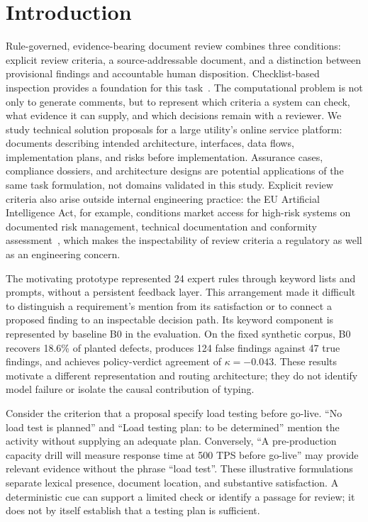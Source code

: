 \documentclass[computers,article,submit,moreauthors]{Definitions/mdpi}
\begin{document}
\section{Introduction}

Rule-governed, evidence-bearing document review combines three conditions: explicit review criteria, a source-addressable document, and a distinction between provisional findings and accountable human disposition. Checklist-based inspection provides a foundation for this task~\cite{fagan1976,lait2000}. The computational problem is not only to generate comments, but to represent which criteria a system can check, what evidence it can supply, and which decisions remain with a reviewer. We study technical solution proposals for a large utility's online service platform: documents describing intended architecture, interfaces, data flows, implementation plans, and risks before implementation. Assurance cases, compliance dossiers, and architecture designs are potential applications of the same task formulation, not domains validated in this study. Explicit review criteria also arise outside internal engineering practice: the EU Artificial Intelligence Act, for example, conditions market access for high-risk systems on documented risk management, technical documentation and conformity assessment~\cite{aiact2024}, which makes the inspectability of review criteria a regulatory as well as an engineering concern.

The motivating prototype represented 24 expert rules through keyword lists and prompts, without a persistent feedback layer. This arrangement made it difficult to distinguish a requirement's mention from its satisfaction or to connect a proposed finding to an inspectable decision path. Its keyword component is represented by baseline B0 in the evaluation. On the fixed synthetic corpus, B0 recovers 18.6\% of planted defects, produces 124 false findings against 47 true findings, and achieves policy-verdict agreement of $\kappa=-0.043$. These results motivate a different representation and routing architecture; they do not identify model failure or isolate the causal contribution of typing.

Consider the criterion that a proposal specify load testing before go-live. ``No load test is planned'' and ``Load testing plan: to be determined'' mention the activity without supplying an adequate plan. Conversely, ``A pre-production capacity drill will measure response time at 500 TPS before go-live'' may provide relevant evidence without the phrase ``load test''. These illustrative formulations separate lexical presence, document location, and substantive satisfaction. A deterministic cue can support a limited check or identify a passage for review; it does not by itself establish that a testing plan is sufficient.
\end{document}
